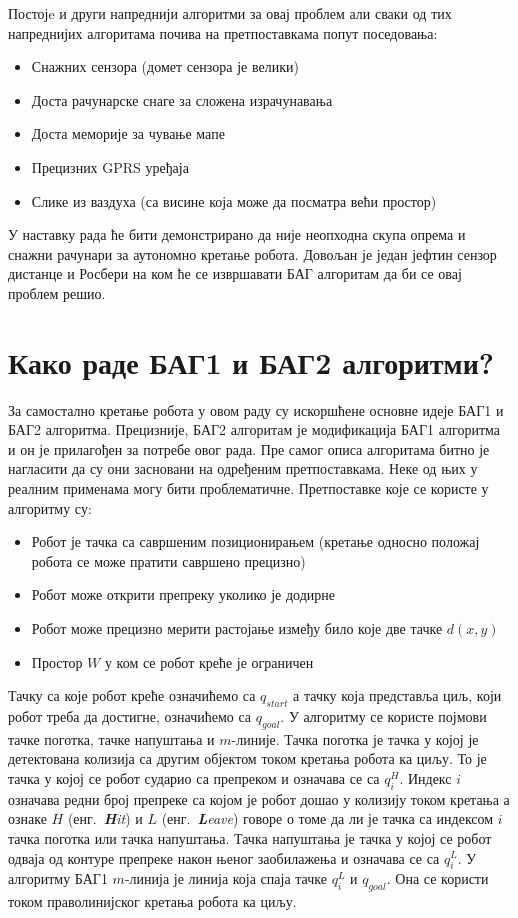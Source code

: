 \documentclass[12pt,oneside]{memoir}
\theoremstyle{remark}
\begin{document}
Постојe и други напреднији алгоритми за овај проблем али сваки од тих напреднијих алгоритама почива на претпоставкама попут поседовања:
\begin{itemize}
\item Снажних сензора (домет сензора је велики)
\item Доста рачунарске снаге за сложена израчунавања
\item Доста меморије за чување мапе
\item Прецизних GPRS уређаја
\item Слике из ваздуха (са висине која може да посматра већи простор)
\end{itemize}

У наставку рада ће бити демонстрирано да није неопходна скупа опрема и снажни рачунари за аутономно кретање робота. Довољан је један јефтин сензор дистанце и Росбери  на ком ће се извршавати БАГ алгоритам да би се овај проблем решио.

\section{Како раде БАГ1 и БАГ2 алгоритми?}
За самостално кретање робота у овом раду су искоршћене основне идеје БАГ1 и БАГ2 алгоритма. Прецизније, БАГ2 алгоритам је модификација БАГ1 алгоритма и он је прилагођен за потребе овог рада. Пре самог описа алгоритама битно је нагласити да су они засновани на одређеним претпоставкама. Неке од њих у реалним применама могу бити проблематичне. Претпоставке које се користе у алгоритму су:
\begin{itemize}
\item Робот је тачка са савршеним позиционирањем (кретање односно положај робота се може пратити савршено прецизно)
\item Робот може открити препреку уколико је додирне
\item Робот може прецизно мерити растојање између било које две тачке $d(x,y)$
\item Простор $W$ у ком се робот креће је ограничен
\end{itemize}

Тачку са које робот креће означићемо са $q_{start}$ а тачку која представља циљ, који робот треба да достигне, означићемо са $q_{goal}$. У алгоритму се користе појмови тачке поготка, тачке напуштања и $m$-линије. Тачка поготка је тачка у којој је детектована колизија са другим објектом током кретања робота ка циљу. То је тачка у којој се робот сударио са препреком и означава се са $q_i^H$. Индекс $i$ означава редни број препреке са којом је робот дошао у колизију током кретања а ознаке $H$  (енг.~{\em \textbf{H}it}) и $L$ (енг.~{\em \textbf{L}eave}) говоре о томе да ли је тачка са индексом $i$ тачка поготка или тачка напуштања. Тачка напуштања је тачка у којој се робот одваја од контуре препреке након њеног заобилажења и означава се са $q_i^L$. У алгоритму БАГ1 $m$-линија је линија која спаја тачке $q_i^L$ и $q_{goal}$. Она се користи током праволинијског кретања робота ка циљу.
\end{document}
